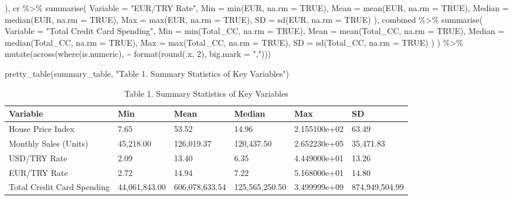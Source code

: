 \documentclass[
  11pt,
  a4paper,
  DIV=11,
  numbers=noendperiod]{scrartcl}
\newenvironment{Shaded}{\begin{snugshade}}{\end{snugshade}}
\newcommand{\AttributeTok}[1]{\textcolor[rgb]{0.40,0.45,0.13}{#1}}
\newcommand{\ConstantTok}[1]{\textcolor[rgb]{0.56,0.35,0.01}{#1}}
\newcommand{\DecValTok}[1]{\textcolor[rgb]{0.68,0.00,0.00}{#1}}
\newcommand{\FunctionTok}[1]{\textcolor[rgb]{0.28,0.35,0.67}{#1}}
\newcommand{\NormalTok}[1]{\textcolor[rgb]{0.00,0.23,0.31}{#1}}
\newcommand{\SpecialCharTok}[1]{\textcolor[rgb]{0.37,0.37,0.37}{#1}}
\newcommand{\StringTok}[1]{\textcolor[rgb]{0.13,0.47,0.30}{#1}}
\begin{document}
\begin{Shaded}
\begin{Highlighting}[]
\NormalTok{  ),}
\NormalTok{  cr }\SpecialCharTok{\%\textgreater{}\%} \FunctionTok{summarise}\NormalTok{(}
    \AttributeTok{Variable =} \StringTok{"EUR/TRY Rate"}\NormalTok{,}
    \AttributeTok{Min =} \FunctionTok{min}\NormalTok{(EUR, }\AttributeTok{na.rm =} \ConstantTok{TRUE}\NormalTok{),}
    \AttributeTok{Mean =} \FunctionTok{mean}\NormalTok{(EUR, }\AttributeTok{na.rm =} \ConstantTok{TRUE}\NormalTok{),}
    \AttributeTok{Median =} \FunctionTok{median}\NormalTok{(EUR, }\AttributeTok{na.rm =} \ConstantTok{TRUE}\NormalTok{),}
    \AttributeTok{Max =} \FunctionTok{max}\NormalTok{(EUR, }\AttributeTok{na.rm =} \ConstantTok{TRUE}\NormalTok{),}
    \AttributeTok{SD =} \FunctionTok{sd}\NormalTok{(EUR, }\AttributeTok{na.rm =} \ConstantTok{TRUE}\NormalTok{)}
\NormalTok{  ),}
\NormalTok{  combined }\SpecialCharTok{\%\textgreater{}\%} \FunctionTok{summarise}\NormalTok{(}
    \AttributeTok{Variable =} \StringTok{"Total Credit Card Spending"}\NormalTok{,}
    \AttributeTok{Min =} \FunctionTok{min}\NormalTok{(Total\_CC, }\AttributeTok{na.rm =} \ConstantTok{TRUE}\NormalTok{),}
    \AttributeTok{Mean =} \FunctionTok{mean}\NormalTok{(Total\_CC, }\AttributeTok{na.rm =} \ConstantTok{TRUE}\NormalTok{),}
    \AttributeTok{Median =} \FunctionTok{median}\NormalTok{(Total\_CC, }\AttributeTok{na.rm =} \ConstantTok{TRUE}\NormalTok{),}
    \AttributeTok{Max =} \FunctionTok{max}\NormalTok{(Total\_CC, }\AttributeTok{na.rm =} \ConstantTok{TRUE}\NormalTok{),}
    \AttributeTok{SD =} \FunctionTok{sd}\NormalTok{(Total\_CC, }\AttributeTok{na.rm =} \ConstantTok{TRUE}\NormalTok{)}
\NormalTok{  )}
\NormalTok{) }\SpecialCharTok{\%\textgreater{}\%}
  \FunctionTok{mutate}\NormalTok{(}\FunctionTok{across}\NormalTok{(}\FunctionTok{where}\NormalTok{(is.numeric), }\SpecialCharTok{\textasciitilde{}} \FunctionTok{format}\NormalTok{(}\FunctionTok{round}\NormalTok{(.x, }\DecValTok{2}\NormalTok{), }\AttributeTok{big.mark =} \StringTok{","}\NormalTok{)))}

\FunctionTok{pretty\_table}\NormalTok{(summary\_table, }\StringTok{"Table 1. Summary Statistics of Key Variables"}\NormalTok{)}
\end{Highlighting}
\end{Shaded}

\begin{longtable}[t]{llllll}
\caption{\label{tab:eda-summary}Table 1. Summary Statistics of Key Variables}\\
\toprule
Variable & Min & Mean & Median & Max & SD\\
\midrule
House Price Index & 7.65 & 53.52 & 14.96 & 2.155100e+02 & 63.49\\
Monthly Sales (Units) & 45,218.00 & 126,019.37 & 120,437.50 & 2.652230e+05 & 35,471.83\\
USD/TRY Rate & 2.09 & 13.40 & 6.35 & 4.449000e+01 & 13.26\\
EUR/TRY Rate & 2.72 & 14.94 & 7.22 & 5.168000e+01 & 14.80\\
Total Credit Card Spending & 44,061,843.00 & 606,078,633.54 & 125,565,250.50 & 3.499999e+09 & 874,949,504.99\\
\bottomrule
\end{longtable}
\end{document}

